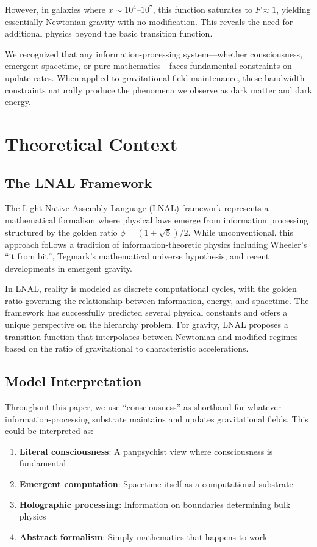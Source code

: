\documentclass[10pt,a4paper]{article}
\begin{document}
However, in galaxies where $x \sim 10^4$--$10^7$, this function saturates to $F \approx 1$, yielding essentially Newtonian gravity with no modification. This reveals the need for additional physics beyond the basic transition function.

We recognized that any information-processing system---whether consciousness, emergent spacetime, or pure mathematics---faces fundamental constraints on update rates. When applied to gravitational field maintenance, these bandwidth constraints naturally produce the phenomena we observe as dark matter and dark energy.

\section{Theoretical Context}

\subsection{The LNAL Framework}

The Light-Native Assembly Language (LNAL) framework represents a mathematical formalism where physical laws emerge from information processing structured by the golden ratio $\phi = (1+\sqrt{5})/2$. While unconventional, this approach follows a tradition of information-theoretic physics including Wheeler's ``it from bit'', Tegmark's mathematical universe hypothesis, and recent developments in emergent gravity.

In LNAL, reality is modeled as discrete computational cycles, with the golden ratio governing the relationship between information, energy, and spacetime. The framework has successfully predicted several physical constants and offers a unique perspective on the hierarchy problem. For gravity, LNAL proposes a transition function that interpolates between Newtonian and modified regimes based on the ratio of gravitational to characteristic accelerations.

\subsection{Model Interpretation}

Throughout this paper, we use ``consciousness'' as shorthand for whatever information-processing substrate maintains and updates gravitational fields. This could be interpreted as:

\begin{enumerate}
\item \textbf{Literal consciousness}: A panpsychist view where consciousness is fundamental
\item \textbf{Emergent computation}: Spacetime itself as a computational substrate
\item \textbf{Holographic processing}: Information on boundaries determining bulk physics
\item \textbf{Abstract formalism}: Simply mathematics that happens to work
\end{enumerate}
\end{document}
